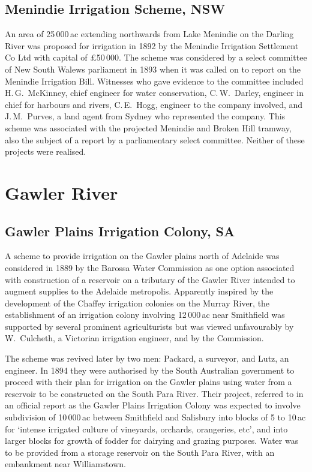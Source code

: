 \subsection*{Menindie Irrigation Scheme, NSW}

An area of 25\,000\,ac extending northwards from Lake Menindie on the
Darling River was proposed for irrigation in 1892 by the Menindie
Irrigation Settlement Co Ltd with capital of \pounds50\,000.  The
scheme was considered by a select committee of New South Walews
parliament in 1893 when it was called on to report on the Menindie
Irrigation Bill.  Witnesses who gave evidence to the committee
included H.\,G.~McKinney, chief engineer for water conservation,
C.\,W.~Darley, engineer in chief for harbours and rivers, C.\,E.~Hogg,
engineer to the company involved, and J.\,M.~Purves, a land agent from
Sydney who represented the company.  This scheme was associated with
the projected Menindie and Broken Hill tramway, also the subject of a
report by a parliamentary select committee.  Neither of these projects
were realised.

\section*{Gawler River}

\subsection*{Gawler Plains Irrigation Colony, SA}

A scheme to provide irrigation on the Gawler plains north of Adelaide
was considered in 1889 by the Barossa Water Commission as one option
associated with construction of a reservoir on a tributary of the
Gawler River intended to augment supplies to the Adelaide metropolis.
Apparently inspired by the development of the Chaffey irrigation
colonies on the Murray River, the establishment of an irrigation
colony involving 12\,000\,ac near Smithfield was supported by several
prominent agriculturists but was viewed unfavourably by W.~Culcheth, a
Victorian irrigation engineer, and by the Commission.

The scheme was revived later by two men: Packard, a surveyor, and
Lutz, an engineer.  In 1894 they were authorised by the South
Australian government to proceed with their plan for irrigation on the
Gawler plains using water from a reservoir to be constructed on the
South Para River.  Their project, referred to in an official report as
the Gawler Plains Irrigation Colony was expected to involve
subdivision of 10\,000\,ac between Smithfield and Salisbury into
blocks of 5 to 10\,ac for `intense irrigated culture of vineyards,
orchards, orangeries, etc', and into larger blocks for growth of
fodder for dairying and grazing purposes.  Water was to be provided
from a storage reservoir on the South Para River, with an embankment
near Williamstown.

